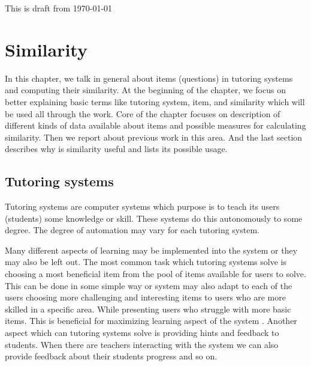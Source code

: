 \documentclass[
  digital, %
  table,   %
  nolof,     %
  nolot,     %
  nocover,
  color
]{fithesis3}
\begin{document}
This is draft from \today %

\chapter{Similarity}



In this chapter, we talk in general about items (questions) in tutoring systems and computing their similarity. At the beginning of the chapter, we focus on better explaining basic terms like tutoring system, item, and similarity which will be used all through the work. Core of the chapter focuses on description of different kinds of data available about items and possible measures for calculating similarity. Then we report about previous work in this area. And the last section describes why is similarity useful and lists its possible usage.


\section{Tutoring systems}\label{tutoring-systems}

Tutoring systems are computer systems which purpose is to teach its users (students) some knowledge or skill. These systems do this autonomously to some degree. The degree of automation may vary for each tutoring system.


Many different aspects of learning may be implemented into the system or they may also be left out. The most common task which tutoring systems solve is choosing a most beneficial item from the pool of items available for users to solve. This can be done in some simple way or system may also adapt to each of the users choosing more challenging and interesting items to users who are more skilled in a specific area. While presenting users who struggle with more basic items. This is beneficial for maximizing learning aspect of the system \cite{papouvsek2015impact}. Another aspect which can tutoring systems solve is providing hints and feedback to students. When there are teachers interacting with the system we can also provide feedback about their students progress and so on.

\end{document}
